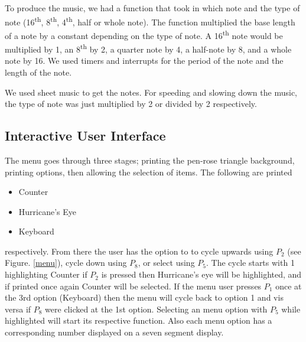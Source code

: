 \documentclass[12pt]{article}
\begin{document}
To produce the music, we had a function that took in which note and the type of note (\num{16}\textsuperscript{th}, \num{8}\textsuperscript{th}, \num{4}\textsuperscript{th}, half or whole note). The function multiplied the base length of a note by a constant depending on the type of note. A \num{16}\textsuperscript{th} note would be multiplied by \num{1}, an \num{8}\textsuperscript{th} by \num{2}, a quarter note by \num{4}, a half-note by \num{8}, and a whole note by \num{16}. We used timers and interrupts for the period of the note and the length of the note.

We used sheet music to get the notes. For speeding and slowing down the music, the type of note was just multiplied by \num{2} or divided by \num{2} respectively.

\subsection{Interactive User Interface}
The menu goes through three stages; printing the pen-rose triangle background, printing options, then allowing the selection of items. The following are printed

\begin{itemize}
    \item Counter
    \item Hurricane's Eye
    \item Keyboard
\end{itemize}

\noindent respectively. From there the user has the option to to cycle upwards using $P_2$ (see Figure. \ref{menu}), cycle down using $P_8$, or select using $P_5$. The cycle starts with 1 highlighting Counter if $P_2$ is pressed then Hurricane's eye will be highlighted, and if printed once again Counter will be selected. If the menu user presses $P_1$ once at the 3rd option (Keyboard) then the menu will cycle back to option 1 and vis versa if $P_8$ were clicked at the 1st option. Selecting an menu option with $P_5$ while highlighted will start its respective function. Also each menu option has a corresponding number displayed on a seven segment display.
\end{document}
